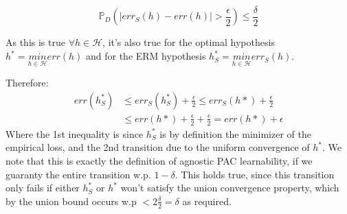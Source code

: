 \begin{equation*}
    \mathbb{P}_D(|err_S(h) - \mathit{err}(h)| > \frac{\epsilon}{2}) \leq \frac{\delta}{2}
\end{equation*}

As this is true $\forall h \in \mathcal{H}$, it's also true for the optimal hypothesis $h^* = \underset{h \in \mathcal{H}}{min} \mathit{err}(h)$ and for the ERM hypothesis $h_S^* = \underset{h \in \mathcal{H}}{min} \mathit{err}_S(h)$.

Therefore:
\begin{equation*}
    \begin{split}        
        \mathit{err}(h_S^*) &\leq \mathit{err}_S(h_S^*) + \frac{\epsilon}{2} \leq \mathit{err}_S(h*) + \frac{\epsilon}{2} \\
        &\leq \mathit{err}(h*) + \frac{\epsilon}{2} + \frac{\epsilon}{2} = \mathit{err}(h*) + \epsilon
    \end{split}
\end{equation*}
Where the 1st inequality is since $h^*_S$ is by definition the minimizer of the empirical loss, and the 2nd transition due to the uniform convergence of $h^*$. We note that this is exactly the definition of agnostic PAC learnability, if we guaranty the entire transition w.p. $1-\delta$. This holds true, since this transition only fails if either $h_S^*$ or $h^*$ won't satisfy the union convergence property, which by the union bound occurs w.p $< 2\frac{\delta}{2} = \delta$ as required. 

